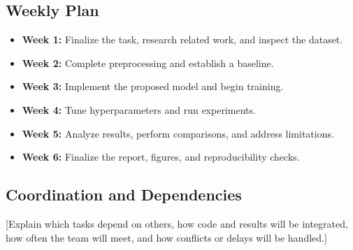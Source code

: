 \documentclass{article}
\begin{document}
\subsection{Weekly Plan}

\begin{itemize}[leftmargin=*]
    \item \textbf{Week 1:} Finalize the task, research related work,
    and inspect the dataset.
    \item \textbf{Week 2:} Complete preprocessing and establish a baseline.
    \item \textbf{Week 3:} Implement the proposed model and begin training.
    \item \textbf{Week 4:} Tune hyperparameters and run experiments.
    \item \textbf{Week 5:} Analyze results, perform comparisons, and
    address limitations.
    \item \textbf{Week 6:} Finalize the report, figures, and reproducibility
    checks.
\end{itemize}

\subsection{Coordination and Dependencies}

[Explain which tasks depend on others, how code and results will be
integrated, how often the team will meet, and how conflicts or delays
will be handled.]




\end{document}
